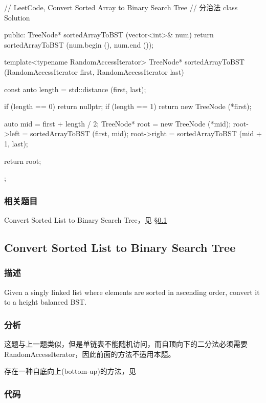 \begin{Code}
// LeetCode, Convert Sorted Array to Binary Search Tree
// 分治法
class Solution {
public:
    TreeNode* sortedArrayToBST (vector<int>& num) {
        return sortedArrayToBST (num.begin (), num.end ());
    }

    template<typename RandomAccessIterator>
    TreeNode* sortedArrayToBST (RandomAccessIterator first, 
            RandomAccessIterator last) {
        const auto length = std::distance (first, last);

        if (length == 0) return nullptr;
        if (length == 1) return new TreeNode (*first);

        auto mid = first + length / 2;
        TreeNode* root = new TreeNode (*mid);
        root->left = sortedArrayToBST (first, mid);
        root->right = sortedArrayToBST (mid + 1, last);

        return root;
    }
};
\end{Code}


\subsubsection{相关题目}
\begindot
\item Convert Sorted List to Binary Search Tree，见 \S \ref{sec:convert-sorted-list-to-binary-search-tree}
\myenddot


\subsection{Convert Sorted List to Binary Search Tree}
\label{sec:convert-sorted-list-to-binary-search-tree}


\subsubsection{描述}
Given a singly linked list where elements are sorted in ascending order, convert it to a height balanced BST.


\subsubsection{分析}
这题与上一题类似，但是单链表不能随机访问，而自顶向下的二分法必须需要RandomAccessIterator，因此前面的方法不适用本题。

存在一种自底向上(bottom-up)的方法，见

\subsubsection{代码}

